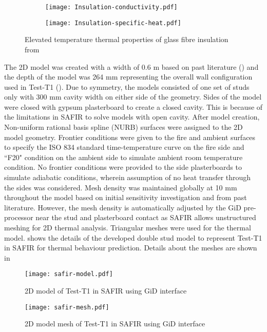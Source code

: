 \begin{figure}[!htbp]
	\centering
	\begin{subfigure}[b]{0.6\textwidth}
		\centering
		\texttt{[image: Insulation-conductivity.pdf]}
		\caption{}
		\label{subfig:Insulation-conductivity}
	\end{subfigure}
	   \label{fig:Insulation-thermal-a}
\end{figure}
\begin{figure}[!htbp]
	\ContinuedFloat
	\centering
	\begin{subfigure}[b]{0.6\textwidth}
		\centering
		\texttt{[image: Insulation-specific-heat.pdf]}
		\caption{}
		\label{subfig:Insulation-specific-heat}
	\end{subfigure}
	   \caption{Elevated temperature thermal properties of glass fibre insulation from \citet{Maneesha2018}}
	   \label{fig:Insulation-thermal}
\end{figure}

The 2D model was created with a width of 0.6 m based on past literature (\citet{Keerthan2012a,Keerthan2013}) and the depth of the model was 264 mm representing the overall wall configuration used in Test-T1 (). Due to symmetry, the models consisted of one set of studs only with 300 mm cavity width on either side of the geometry. Sides of the model were closed with gypsum plasterboard to create a closed cavity. This is because of the limitations in SAFIR to solve models with open cavity. After model creation, Non-uniform rational basis spline (NURB) surfaces were assigned to the 2D model geometry. Frontier conditions were given to the fire and ambient surfaces to specify the ISO 834 standard time-temperature curve on the fire side and ``F20" condition on the ambient side to simulate ambient room temperature condition. No frontier conditions were provided to the side plasterboards to simulate adiabatic conditions, wherein assumption of no heat transfer through the sides was considered. Mesh density was maintained globally at 10 mm throughout the model based on initial sensitivity investigation and from past literature. However, the mesh density is automatically adjusted by the GiD pre-processor near the stud and plasterboard contact as SAFIR allows unstructured meshing for 2D thermal analysis. Triangular meshes were used for the thermal model.  shows the details of the developed double stud model to represent Test-T1 in SAFIR for thermal behaviour prediction. Details about the meshes are shown in 
\begin{figure}[!htbp]
	\centering
	\texttt{[image: safir-model.pdf]}
	\caption{2D model of Test-T1 in SAFIR using GiD interface}
	\label{fig:safir-model}
\end{figure}
\begin{figure}[!htbp]
	\centering
	\texttt{[image: safir-mesh.pdf]}
	\caption{2D model mesh of Test-T1 in SAFIR using GiD interface}
	\label{fig:safir-mesh}
\end{figure}

